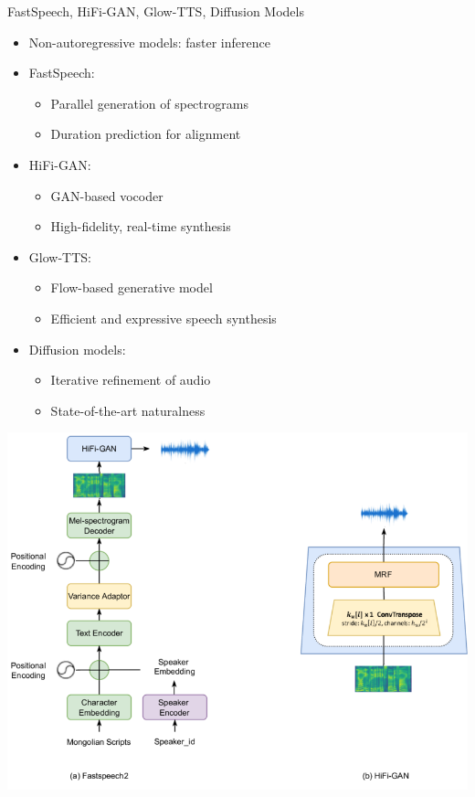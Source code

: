 \begin{frame}[allowframebreaks]{FastSpeech, HiFi-GAN, Glow-TTS, Diffusion Models}
    \begin{itemize}
        \setlength{\itemsep}{1.5em}
        \item Non-autoregressive models: faster inference
        \item FastSpeech:
        \begin{itemize}
            \item Parallel generation of spectrograms
            \item Duration prediction for alignment
        \end{itemize}
        \item HiFi-GAN:
        \begin{itemize}
            \item GAN-based vocoder
            \item High-fidelity, real-time synthesis
        \end{itemize}
    \framebreak
        \item Glow-TTS:
        \begin{itemize}
            \item Flow-based generative model
            \item Efficient and expressive speech synthesis
        \end{itemize}
        \item Diffusion models:
        \begin{itemize}
            \item Iterative refinement of audio
            \item State-of-the-art naturalness
        \end{itemize}
    \end{itemize}
    \begin{center}
        \includegraphics[width=\textwidth,height=0.9\textheight,keepaspectratio]{images/audio-nlp/fastspeech_hifigan.png}
    \end{center}
\end{frame}